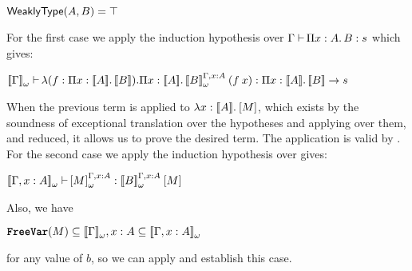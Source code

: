 \begin{Proof}
\begin{ProofCase}{\CicAbs}
\begin{SubProofCase}{$\weaklypropFun[A,B] = \True$}
For the first case we apply the induction hypothesis over 
$$ which gives:
\begin{center}
$$
\end{center}
When the previous term is applied to $$, which exists by 
the soundness of exceptional translation over the hypotheses and applying \CicAbs{} over them,
and reduced, it allows us to prove the desired term. The application is valid by \CicAbs{}. 
For the second case we apply the induction hypothesis over  gives:
\begin{center}
$$
\end{center}
Also, we have
\begin{center}
$\subseteq\WContextTrans{\Context},\subseteq{}$
\end{center}
for any value of $b$, so we can apply 
and establish this case.
\end{SubProofCase}


\end{ProofCase}
\end{Proof}
